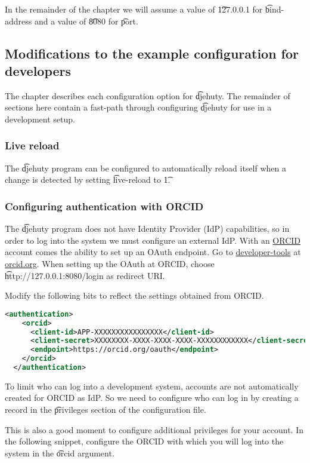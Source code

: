 In the remainder of the chapter we will assume a value of \t{127.0.0.1} for
\t{bind-address} and a value of \t{8080} for \t{port}.

\subsection{Modifications to the example configuration for developers}

The chapter  describes each configuration
option for \t{djehuty}.  The remainder of sections here contain a fast-path
through configuring \t{djehuty} for use in a development setup.

\subsubsection{Live reload}

The \t{djehuty} program can be configured to automatically reload itself when
a change is detected by setting \t{live-reload} to \t{1}.

\subsubsection{Configuring authentication with ORCID}

The \t{djehuty} program does not have Identity Provider (IdP) capabilities,
so in order to log into the system we must configure an external IdP.  With
an \href{https://orcid.org}{ORCID} account comes the ability to set up an OAuth
endpoint.  Go to \href{https://orcid.org/developer-tools}{developer-tools} at
\href{https://orcid.org}{orcid.org}.  When setting up the OAuth at ORCID,
choose \t{http://127.0.0.1:8080/login} as redirect URI.

Modify the following bits to reflect the settings obtained from ORCID.
\begin{lstlisting}[language=xml]
  <authentication>
    <orcid>
      <client-id>APP-XXXXXXXXXXXXXXXX</client-id>
      <client-secret>XXXXXXXX-XXXX-XXXX-XXXX-XXXXXXXXXXXX</client-secret>
      <endpoint>https://orcid.org/oauth</endpoint>
    </orcid>
  </authentication>
\end{lstlisting}

To limit who can log into a development system, accounts are not automatically
created for ORCID as IdP.  So we need to configure who can log in by creating
a record in the \t{privileges} section of the configuration file.

This is also a good moment to configure additional privileges for your account.
In the following snippet, configure the ORCID with which you will log into
the system in the \t{orcid} argument.

